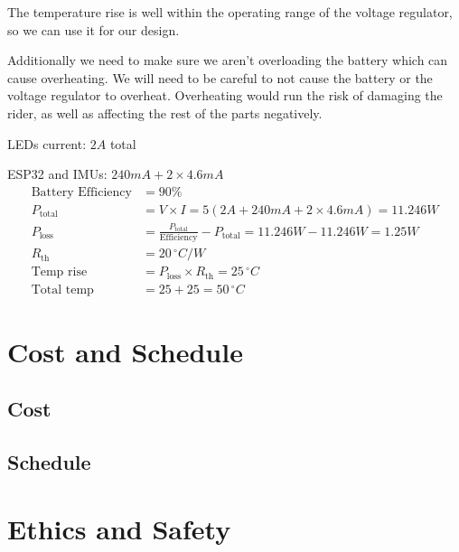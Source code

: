 \documentclass[12pt]{article}
\begin{document}
\noindent The temperature rise is well within the operating range of the voltage regulator, so we can use it for our design.


\noindent Additionally we need to make sure we aren’t 
overloading the battery which can cause overheating. We will 
need to be careful to not cause the battery or the voltage 
regulator to overheat. Overheating would run the risk of 
damaging the rider, as well as affecting the rest of the parts 
negatively.

\noindent LEDs current: \( 2A \) total 

\noindent ESP32 and IMUs: \( 240mA + 2 \times 4.6mA \)
\begin{align*}
\text{Battery Efficiency} &= 90\% \\
P_{\text{total}} &= V \times I = 5(2A + 240mA + 2 \times 4.6mA) = 11.246W \\
P_{\text{loss}} &= \frac{P_{\text{total}}}{\text{Efficiency}} - P_{\text{total}} = 11.246W - 11.246W = 1.25W \\
R_{\text{th}} &= 20 \, ^{\circ}C/W \\
\text{Temp rise} &= P_{\text{loss}} \times R_{\text{th}} = 25 \, ^{\circ}C \\
\text{Total temp} &= 25 + 25 = 50 \, ^{\circ}C
\end{align*}

\section{Cost and Schedule}

\subsection{Cost}
\subsection{Schedule}

\section{Ethics and Safety}
\end{document}
